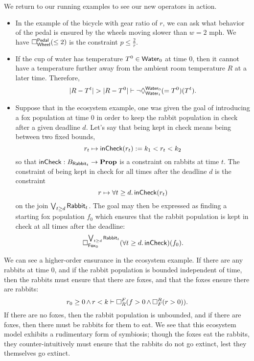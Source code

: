     \begin{ex}
    We return to our running examples to see our new operators in action.
    \begin{itemize}
        \item In the example of the bicycle with gear ratio of $r$, we can ask what behavior of the pedal is ensured by the wheels moving slower than $w=2$ mph. We have $\ensure{\type{Pedal}}{\type{Wheel}}(\leq 2)$ is the constraint $p\leq \frac{2}{r}$.
        
        \item If the cup of water has temperature $T^0\in \type{Water}_0$ at time $0$, then it cannot have a temperature further away from the ambient room temperature $R$ at a later time. Therefore, 
        $$|R - T^t| > |R - T^0| \vdash \neg \allows{\type{Water}_0}{\type{Water}_t}(=T^0)(T^t).$$
        
        \item Suppose that in the ecosystem example, one was given the goal of introducing a fox population at time $0$ in order to keep the rabbit population in check after a given deadline $d$. Let's say that being kept in check means being between two fixed bounds, $$r_t \mapsto \term{inCheck}(r_t) := k_1 < r_t < k_2$$
        so that $\term{inCheck} : B_{\type{Rabbit}_t} \to \Prop$ is a constraint on rabbits at time $t$. The constraint of being kept in check for all times after the deadline $d$ is the constraint
        $$r \mapsto \forall t \geq d.\, \term{inCheck}(r_t)$$
        on the join $\bigvee_{t \geq d} \type{Rabbit}_t$. The goal may then be expressed as finding a starting fox population $f_0$ which ensures that the rabbit population is kept in check at all times after the deadline:
        $$\ensure{\bigvee_{t \geq d} \type{Rabbit}_t}{\type{Fox}_0}(\forall t \geq d.\, \term{inCheck})(f_0).$$   
        \end{itemize}
 \end{ex}
 
\begin{ex}
We can see a higher-order ensurance in the ecosystem example. If there are any rabbits at time $0$, and if the rabbit population is bounded independent of time, then the rabbits must ensure that there are foxes, and that the foxes ensure there are rabbits:
    $$r_0 \geq 0 \meet r < k \vdash \ensure{F}{R} (f > 0 \meet \ensure{R}{F}(r > 0)).$$ 
If there are no foxes, then the rabbit population is unbounded, and if there are foxes, then there must be rabbits for them to eat. We see that this ecosystem model exhibits a rudimentary form of symbiosis; though the foxes eat the rabbits, they counter-intuitively must ensure that the rabbits do not go extinct, lest they themselves go extinct.
\end{ex}
 

